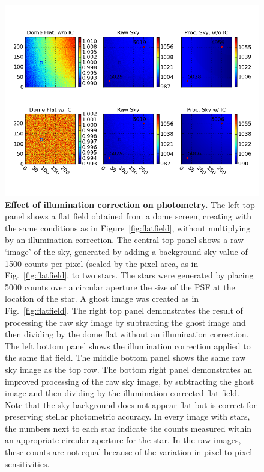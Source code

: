 \documentclass[12pt,preprint]{aastex}
\begin{document}
\begin{figure}[htbp]
\includegraphics[width=6in]{ICeffect}
\caption{ {\small
{\bf Effect of illumination correction on photometry.}
The left top panel shows a flat field obtained from a dome screen,
creating with the same conditions as in Figure~\ref{fig:flatfield},
without multiplying by an illumination correction. The central top
panel shows a raw `image' of the sky, generated by adding a background
sky value of 1500 counts per pixel (scaled by the pixel area, as in
Fig.~\ref{fig:flatfield}, to two stars. The stars were generated by
placing 5000 counts over a circular aperture the size of the PSF at
the location of the star. A ghost image was created as in
Fig.~\ref{fig:flatfield}.  The right top panel demonstrates the result
of processing the raw sky image by subtracting the ghost image and
then dividing by the dome flat without an
illumination correction. 
The left bottom panel shows the illumination correction applied to the
same flat field. The middle bottom panel shows the same raw sky image as
the top row. The bottom right panel demonstrates an improved processing
of the raw sky image, by subtracting the ghost image and then dividing
by the illumination corrected flat field. 
Note that the sky background does not appear
flat but is correct for preserving stellar photometric accuracy. 
In every image with stars, the numbers next to each star indicate the
counts measured within an appropriate circular aperture for the
star. In the raw images, these counts are not equal because of the
variation in pixel to pixel sensitivities. }} \label{fig:iceffect} 
\end{figure}
\end{document}
